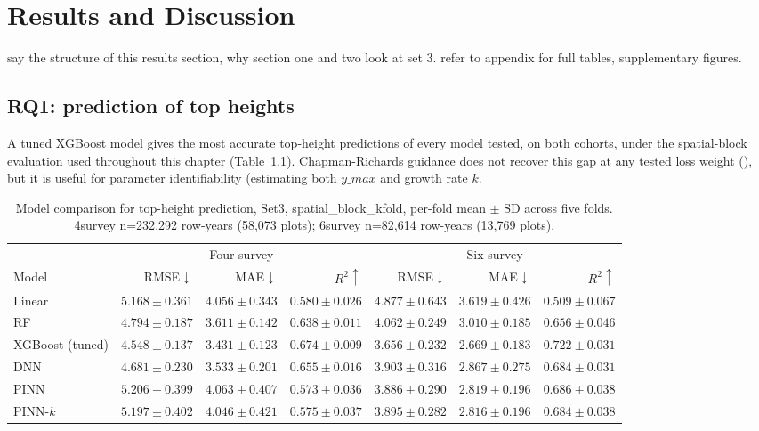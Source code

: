 
\chapter{Results and Discussion}
\label{ch:results}

say the structure of this results section, why section one and two look at set 3. refer to appendix for full tables, supplementary figures. 

\section{RQ1: prediction of top heights} 

A tuned XGBoost model gives the most accurate top-height predictions of every model
tested, on both cohorts, under the spatial-block evaluation used throughout this
chapter (Table~\ref{tab:results-rq1}). Chapman-Richards guidance does not recover this
gap at any tested loss weight (), but it is useful for parameter identifiability (estimating both $y\_max$ and growth rate $k$. 


\begin{table}[!htbp]
\centering
\scriptsize
\setlength{\tabcolsep}{4pt}
\renewcommand{\arraystretch}{1.2}
\begin{tabular}{lrrrrrr}
\toprule
& \multicolumn{3}{c}{Four-survey} & \multicolumn{3}{c}{Six-survey} \\
\cmidrule(lr){2-4} \cmidrule(lr){5-7}
Model & RMSE${\downarrow}$ & MAE${\downarrow}$ & $R^2{\uparrow}$ & RMSE${\downarrow}$ & MAE${\downarrow}$ & $R^2{\uparrow}$ \\
\midrule
Linear & $5.168{\pm}0.361$ & $4.056{\pm}0.343$ & $0.580{\pm}0.026$ & $4.877{\pm}0.643$ & $3.619{\pm}0.426$ & $0.509{\pm}0.067$ \\
RF & $4.794{\pm}0.187$ & $3.611{\pm}0.142$ & $0.638{\pm}0.011$ & $4.062{\pm}0.249$ & $3.010{\pm}0.185$ & $0.656{\pm}0.046$ \\
XGBoost (tuned) & $\mathbf{4.548{\pm}0.137}$ & $\mathbf{3.431{\pm}0.123}$ & $\mathbf{0.674{\pm}0.009}$ & $\mathbf{3.656{\pm}0.232}$ & $\mathbf{2.669{\pm}0.183}$ & $\mathbf{0.722{\pm}0.031}$ \\
DNN & $4.681{\pm}0.230$ & $3.533{\pm}0.201$ & $0.655{\pm}0.016$ & $3.903{\pm}0.316$ & $2.867{\pm}0.275$ & $0.684{\pm}0.031$ \\
PINN & $5.206{\pm}0.399$ & $4.063{\pm}0.407$ & $0.573{\pm}0.036$ & $3.886{\pm}0.290$ & $2.819{\pm}0.196$ & $0.686{\pm}0.038$ \\
PINN-$k$ & $5.197{\pm}0.402$ & $4.046{\pm}0.421$ & $0.575{\pm}0.037$ & $3.895{\pm}0.282$ & $2.816{\pm}0.196$ & $0.684{\pm}0.038$ \\
\bottomrule
\end{tabular}
\caption{Model comparison for top-height prediction, Set3, spatial\_block\_kfold,
per-fold mean $\pm$ SD across five folds. 4survey n=232{,}292 row-years (58{,}073
plots); 6survey n=82{,}614 row-years (13{,}769 plots).} 
\label{tab:results-rq1}
\end{table}

